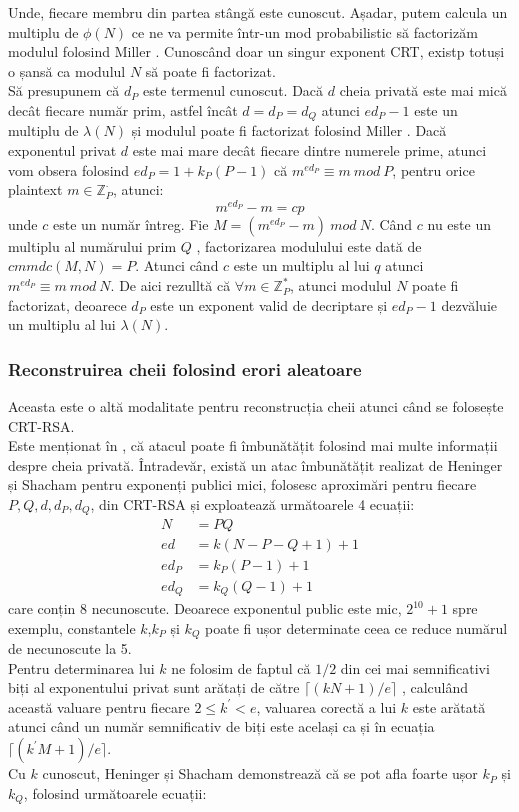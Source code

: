 \documentclass[12pt, oneside]{book}
\begin{document}
Unde, fiecare membru din partea stângă este cunoscut.  Așadar, putem calcula un multiplu de $\phi(N)$ ce ne va permite într-un mod probabilistic să factorizăm modulul folosind Miller \cite{miller}.
Cunoscând doar un singur exponent CRT, existp totuși o șansă ca modulul $N$ să poate fi factorizat.\\
Să presupunem că $d_P$ este termenul cunoscut. Dacă $d$ cheia privată este mai mică decât fiecare număr prim, astfel încât $d = d_P = d_Q$ atunci $ed_P-1$ este un multiplu de $\lambda(N)$ și modulul poate fi factorizat folosind Miller \cite{miller}. Dacă exponentul privat $d$ este mai mare decât fiecare dintre numerele prime, atunci vom obsera folosind $ed_P = 1 + k_P(P-1)$ că $m^{ed_P} \equiv m \ mod \ P$, pentru orice plaintext $m \in \mathbb{Z}_{P}^{ \cdot }$, atunci:
$$ m^{ed_P} - m = cp$$
unde $c$ este un număr întreg. Fie $M=(m^{ed_P} - m) \ mod \ N$. Când $c$ nu este un multiplu al numărului prim $Q$ , factorizarea modulului este dată de $cmmdc(M,N)=P$. Atunci când $c$ este un multiplu al lui $q$ atunci $m^{ed_P} \equiv m \ mod \ N$. De aici rezulltă că $\forall m \in \mathbb{Z}_{P}^{*}$, atunci modulul $N$ poate fi factorizat, deoarece $d_P$ este un exponent valid de decriptare și $ed_P-1$ dezvăluie un multiplu al lui $\lambda(N)$.
\subsubsection{Reconstruirea cheii folosind erori aleatoare}
Aceasta este o altă modalitate pentru reconstrucția cheii atunci când se folosește CRT-RSA.\\
Este menționat în \cite{95}, că atacul poate fi îmbunătățit folosind mai multe informații despre cheia privată. Întradevăr, există un atac îmbunătățit realizat de Heninger și Shacham \cite{heninger} pentru exponenți publici mici, folosesc aproximări pentru fiecare $P,Q,d,d_P,d_Q$, din CRT-RSA și exploatează următoarele 4 ecuații:
\begin{align*}
N&=PQ \\
ed&=k(N-P-Q+1)+1\\
ed_P&=k_P(P-1)+1\\
ed_Q&=k_Q(Q-1)+1 
\end{align*}
care conțin 8 necunoscute. Deoarece exponentul public este mic, $2^{10}+1$ spre exemplu, constantele $k$,$k_P$ și $k_Q$ poate fi ușor determinate ceea ce reduce numărul de necunoscute la 5.\\
Pentru determinarea lui $k$ ne folosim de faptul că $1/2$ din cei mai semnificativi biți al exponentului privat sunt arătați de către $\lceil (kN+1)/e \rceil $ , calculând această valuare pentru fiecare $2 \leq k^{'} < e$, valuarea corectă a lui $k$ este arătată atunci când un număr semnificativ de biți este același ca și în ecuația $ \lceil (k^{'}M+1)/e   \rceil$. \\
Cu $k$ cunoscut, Heninger și Shacham demonstrează că se pot afla foarte ușor $k_P$ și $k_Q$, folosind următoarele ecuații: 
\end{document}
